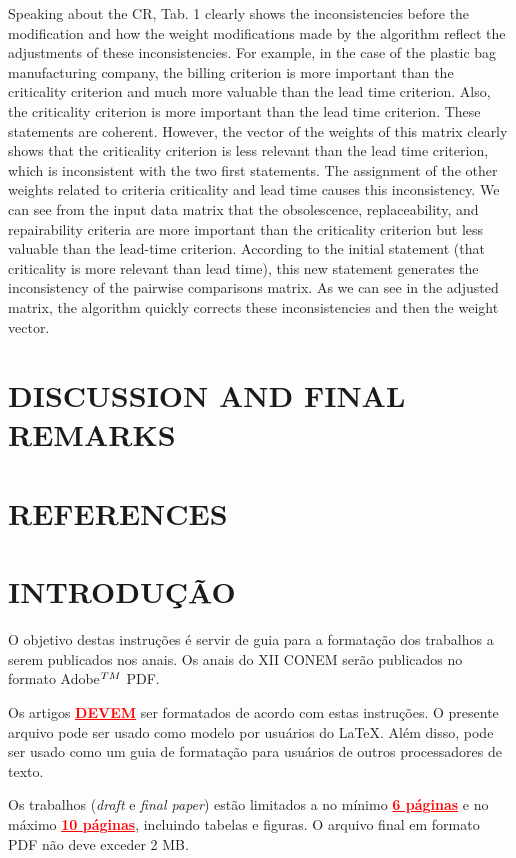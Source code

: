 \documentclass[10pt,fleqn,a4paper,twoside]{article}
\begin{document}
Speaking about the CR, Tab. 1 clearly shows the inconsistencies before the modification and how the weight modifications made by the algorithm reflect the adjustments
of these inconsistencies. For example, in the case of the plastic bag manufacturing company, the billing criterion is more important than the criticality criterion and much more valuable than the lead time criterion. Also, the criticality criterion is more important than the lead time criterion. These statements are coherent. However, the vector of the weights of this matrix clearly shows that the criticality criterion is less relevant than the lead time criterion, which is inconsistent with the two first statements. The assignment of the other weights related to criteria criticality and lead time causes this inconsistency. We can see from the input data matrix that the obsolescence, replaceability, and repairability criteria are more important than the criticality criterion but less valuable than the lead-time criterion. According to the initial statement (that criticality is more relevant than lead time), this new statement generates the inconsistency of the pairwise comparisons matrix. As we can see in the adjusted matrix, the algorithm quickly corrects these inconsistencies and then the weight vector.

	\section{DISCUSSION AND FINAL REMARKS}


    \section{REFERENCES}
    
    \section{INTRODUÇÃO}
        
        O objetivo destas instruções é servir de guia para a formatação dos trabalhos a serem publicados nos anais. Os anais do XII CONEM serão publicados no formato Adobe$^{\small{TM}}$ PDF.

        Os artigos \textcolor{red}{\underline{\textbf{DEVEM}}} ser formatados de acordo com estas instruções. O presente arquivo pode ser usado como modelo por usuários do \LaTeX. Além disso, pode ser usado como um guia de formatação para usuários de outros processadores de texto.

        Os trabalhos (\textit{draft} e \textit{final paper}) estão limitados a no mínimo \textcolor{red}{\underline{\textbf{6 páginas}}} e no máximo \textcolor{red}{\underline{\textbf{10 páginas}}}, incluindo tabelas e figuras. O arquivo final em formato PDF não deve exceder 2 MB.
\end{document}
